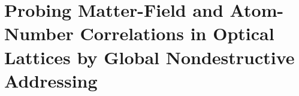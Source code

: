 
\chapter{Probing Matter-Field and Atom-Number Correlations in Optical Lattices
  by Global Nondestructive Addressing}  %

\ifpdf
    \graphicspath{{Chapter3/Figs/Raster/}{Chapter3/Figs/PDF/}{Chapter3/Figs/}}
\else
    \graphicspath{{Chapter3/Figs/Vector/}{Chapter3/Figs/}}
\fi


